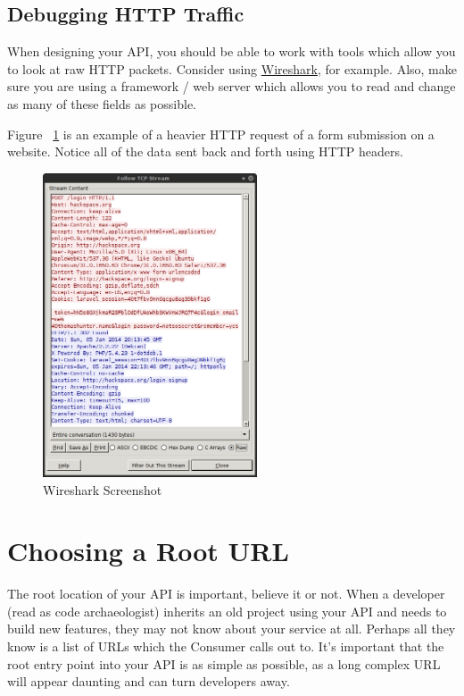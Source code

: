 \documentclass{book}
\begin{document}
\subsection{Debugging HTTP Traffic}

When designing your API, you should be able to work with tools which allow you to look at raw HTTP packets. Consider using \href{https://www.wireshark.org}{Wireshark}, for example. Also, make sure you are using a framework / web server which allows you to read and change as many of these fields as possible.

Figure ~\ref{fig:wireshark} is an example of a heavier HTTP request of a form submission on a website. Notice all of the data sent back and forth using HTTP headers.

\begin{figure}[ht!]
\centering
\includegraphics[height=90mm]{images/wireshark.png}
\caption{Wireshark Screenshot}
\label{fig:wireshark}
\end{figure}


\section{Choosing a Root URL}

The root location of your API is important, believe it or not. When a developer (read as code archaeologist) inherits an old project using your API and needs to build new features, they may not know about your service at all. Perhaps all they know is a list of URLs which the Consumer calls out to. It's important that the root entry point into your API is as simple as possible, as a long complex URL will appear daunting and can turn developers away.
\end{document}
